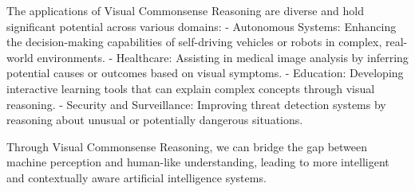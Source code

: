 The applications of Visual Commonsense Reasoning are diverse and hold significant potential across various domains:
- Autonomous Systems: Enhancing the decision-making capabilities of self-driving vehicles or robots in complex, real-world environments.
- Healthcare: Assisting in medical image analysis by inferring potential causes or outcomes based on visual symptoms.
- Education: Developing interactive learning tools that can explain complex concepts through visual reasoning.
- Security and Surveillance: Improving threat detection systems by reasoning about unusual or potentially dangerous situations.

Through Visual Commonsense Reasoning, we can bridge the gap between machine perception and human-like understanding, leading to more intelligent and contextually aware artificial intelligence systems.





